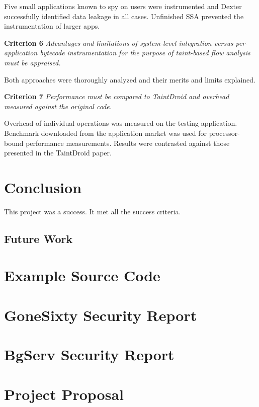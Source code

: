 \documentclass[12pt,twoside,notitlepage]{report}
\begin{document}
\begin{description}
	Five small applications known to spy on users were instrumented and Dexter successfully identified data leakage in all cases. Unfinished SSA prevented the instrumentation of larger apps.
      
	\item \textbf{Criterion 6} \emph{Advantages and limitations of system-level integration versus per-application bytecode instrumentation for the purpose of taint-based flow analysis must be appraised.}

	Both approaches were thoroughly analyzed and their merits and limits explained.

	\item \textbf{Criterion 7} \emph{Performance must be compared to TaintDroid and overhead measured against the original code.}

	Overhead of individual operations was measured on the testing application. Benchmark downloaded from the application market was used for processor-bound performance measurements. Results were contrasted against those presented in the TaintDroid paper.
\end{description}

\cleardoublepage
\chapter{Conclusion}

This project was a success. It met all the success criteria.

\section{Future Work}

\cleardoublepage



\cleardoublepage

\appendix

\chapter{Example Source Code}

\cleardoublepage

\chapter{GoneSixty Security Report}
\label{chapter:Report_Gone60}

\cleardoublepage

\chapter{BgServ Security Report}
\label{chapter:Report_BgServ}

\cleardoublepage

\chapter{Project Proposal}


\end{document}
